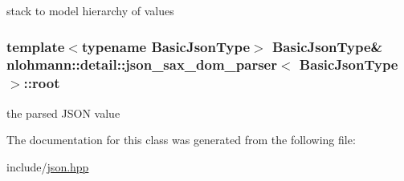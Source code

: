 stack to model hierarchy of values 

\subsubsection[{\texorpdfstring{root}{root}}]{\setlength{\rightskip}{0pt plus 5cm}template$<$typename Basic\+Json\+Type$>$ Basic\+Json\+Type\& {\bf nlohmann\+::detail\+::json\+\_\+sax\+\_\+dom\+\_\+parser}$<$ Basic\+Json\+Type $>$\+::root\hspace{0.3cm}{\ttfamily [private]}}\hypertarget{classnlohmann_1_1detail_1_1json__sax__dom__parser_aef0477277389e399d7128898841b71c0}{}\label{classnlohmann_1_1detail_1_1json__sax__dom__parser_aef0477277389e399d7128898841b71c0}


the parsed J\+S\+ON value 



The documentation for this class was generated from the following file\+:\begin{DoxyCompactItemize}
\item 
include/\hyperlink{json_8hpp}{json.\+hpp}\end{DoxyCompactItemize}
